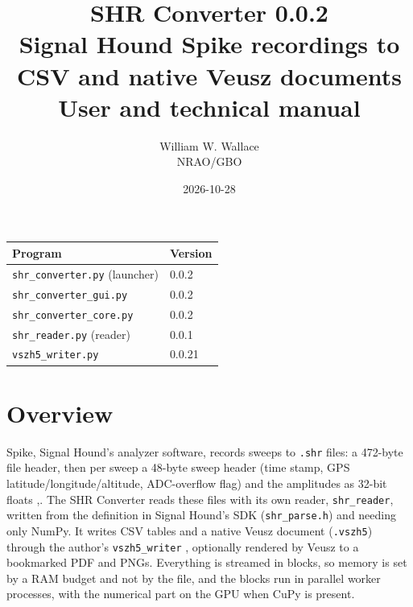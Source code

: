 \documentclass[11pt,a4paper]{article}
\title{SHR Converter 0.0.2\\[4pt]\large Signal Hound Spike \code{.shr} recordings to CSV and native Veusz documents\\
User and technical manual}
\author{William W. Wallace\\NRAO/GBO\\\code{wwallace@nrao.edu}}
\date{2026-10-28}
\newcommand{\code}[1]{\texttt{#1}}
\begin{document}
\maketitle
\begin{center}
\begin{tabular}{ll}
\toprule
Program & Version\\
\midrule
\code{shr\_converter.py} (launcher) & 0.0.2\\
\code{shr\_converter\_gui.py} & 0.0.2\\
\code{shr\_converter\_core.py} & 0.0.2\\
\code{shr\_reader.py} (reader) & 0.0.1\\
\code{vszh5\_writer.py} & 0.0.21\\
\bottomrule
\end{tabular}
\end{center}
\tableofcontents
\clearpage

\section{Overview}
Spike, Signal Hound's analyzer software, records sweeps to \code{.shr} files: a 472-byte file header, then
per sweep a 48-byte sweep header (time stamp, GPS latitude/longitude/altitude, ADC-overflow flag) and the
amplitudes as 32-bit floats \cite{r1},\cite{r2}. The SHR Converter reads these files with its own reader,
\code{shr\_reader}, written from the definition in Signal Hound's SDK (\code{shr\_parse.h}) \cite{r1} and
needing only NumPy. It writes CSV tables and a native Veusz document (\code{.vszh5}) through the author's
\code{vszh5\_writer} \cite{r3}, optionally rendered by Veusz \cite{r14} to a bookmarked PDF and PNGs.
Everything is streamed in blocks, so memory is set by a RAM budget and not by the file, and the blocks run in
parallel worker processes, with the numerical part on the GPU when CuPy is present.
\end{document}
